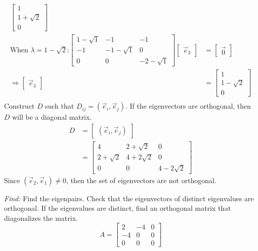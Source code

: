 \documentclass[11pt]{homework}
\begin{document}
\begin{align*}
\begin{bmatrix}
    1 \\
    1 + \sqrt{2} \\
    0
  \end{bmatrix}  \\
\text{When $\lambda = 1 - \sqrt{2}$:}
  \begin{bmatrix}
  1- \sqrt{1}  & -1 & -1 \\
  -1 & -1 - \sqrt{1} & 0 \\
  0 & 0 & -2 - \sqrt{1}
  \end{bmatrix}
  \begin{bmatrix}
    \vec e_3
  \end{bmatrix}
  &= 
  \begin{bmatrix}
    \vec 0
  \end{bmatrix} \\
  \Rightarrow
  \begin{bmatrix}
    \vec e_3
  \end{bmatrix}
  &= 
  \begin{bmatrix}
    1 \\
    1 - \sqrt{2} \\
    0
  \end{bmatrix}  \\
\end{align*}
Construct $D$ such that $D_{ij} = (\vec e_i, \vec e_j)$. 
If the eigenvectors are orthogonal, 
then $D$ will be a diagonal matrix.
\begin{align*}
D &= 
  \begin{bmatrix}
  (\vec e_i, \vec e_j)
  \end{bmatrix} \\
  &=
  \begin{bmatrix}
    4 & 2 +\sqrt{2} & 0 \\
    2+\sqrt{2} & 4 + 2\sqrt{2} & 0 \\
    0 & 0 & 4- 2\sqrt{2}
  \end{bmatrix}
\end{align*}
Since $( \vec e_2, \vec e_1) \neq 0$, 
then the set of eigenvectors are not orthogonal.

\newpage
\question
\emph{Find:}
\newline
Find the eigenpairs.
Check that the eigenvectors of distinct eigenvalues are orthogonal.
If the eigenvalues are distinct, find an orthogonal matrix that diagonalizes the matrix.
\begin{equation*}
A = 
  \begin{bmatrix}
  2 & -4 & 0 \\
  -4 & 0 & 0 \\
  0 &  0 & 0
  \end{bmatrix}
\end{equation*}
\end{document}
